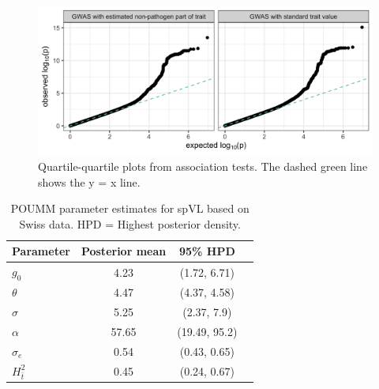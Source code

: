 \documentclass[]{article}
\begin{document}
\begin{doublespace}
\begin{figure}[H]
	\centering
	\includegraphics[width=\linewidth]{figures/qq_plots.png}
	\caption{Quartile-quartile plots from association tests. The dashed green line shows the y = x line.}
	\label{fig:qq-plots}
\end{figure}

\end{doublespace}  %

\newpage

\begin{table}[H]
\caption{POUMM parameter estimates for spVL based on Swiss data. HPD = Highest posterior density.}
	\begin{tabular}{lccc} \hline 
	Parameter & Posterior mean & 95\% HPD \\ \hline 
	${g_{0}}$ & 4.23 & (1.72, 6.71) \\
	$\theta$ & 4.47 & (4.37, 4.58) \\
	$\sigma$ & 5.25 & (2.37, 7.9) \\
	$\alpha$ & 57.65 & (19.49, 95.2) \\
	$\sigma_e$ & 0.54 & (0.43, 0.65) \\ 
	$H^2_{\bar{t}}$ & 0.45 & (0.24, 0.67) \\ \hline
	\end{tabular}
	\label{tab:POUMM-parameters}
\end{table}
\end{document}
